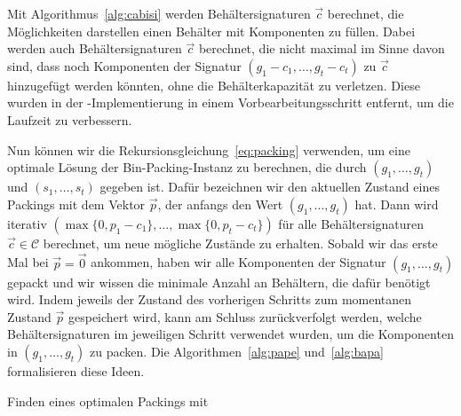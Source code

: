 \begin{rem}
    Mit Algorithmus~\ref{alg:cabisi} werden Behältersignaturen $\vec{c}$ berechnet, die Möglichkeiten darstellen einen Behälter mit Komponenten zu füllen.
    Dabei werden auch Behältersignaturen $\vec{c}$ berechnet, die nicht maximal im Sinne davon sind, dass noch Komponenten der Signatur $(g_1 - c_1, \ldots, g_t - c_t)$ zu $\vec{c}$ hinzugefügt werden könnten, ohne die Behälterkapazität zu verletzen.
    Diese wurden in der \Cpp\hyp Implementierung in einem Vorbearbeitungsschritt entfernt, um die Laufzeit zu verbessern.
\end{rem}

Nun können wir die Rekursionsgleichung~\eqref{eq:packing} verwenden, um eine optimale Lösung der Bin-Packing-Instanz zu berechnen, die durch $(g_1, \ldots, g_t)$ und $(s_1, \ldots, s_t)$ gegeben ist.
Dafür bezeichnen wir den aktuellen Zustand eines Packings mit dem Vektor $\vec{p}$, der anfangs den Wert $(g_1, \ldots, g_t)$ hat.
Dann wird iterativ $(\max\{0, p_1 - c_1\}, \ldots, \max\{0, p_t - c_t\})$ für alle Behältersignaturen $\vec{c} \in \mathcal{C}$ berechnet, um neue mögliche Zustände zu erhalten.
Sobald wir das erste Mal bei $\vec{p} = \vec{0}$ ankommen, haben wir alle Komponenten der Signatur $(g_1, \ldots, g_t)$ gepackt und wir wissen die minimale Anzahl an Behältern, die dafür benötigt wird.
Indem jeweils der Zustand des vorherigen Schritts zum momentanen Zustand $\vec{p}$ gespeichert wird, kann am Schluss zurückverfolgt werden, welche Behältersignaturen im jeweiligen Schritt verwendet wurden, um die Komponenten in $(g_1, \ldots, g_t)$ zu packen.
Die Algorithmen~\ref{alg:pape} und~\ref{alg:bapa} formalisieren diese Ideen.

\begin{algorithm}
    \caption{Finden eines optimalen Packings mit }
    \label{alg:pape}
    \begin{algorithmic}[1]
                    \EndIf
                \EndFor
                \EndFor
            \EndFor
        \EndFunction
    \end{algorithmic}
\end{algorithm}

